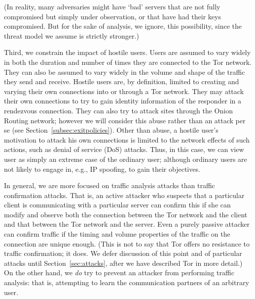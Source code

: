 \documentclass[times,10pt,twocolumn]{article}
\begin{document}
(In reality, many adversaries might have `bad' servers that are not
fully compromised but simply under observation, or that have had their keys
compromised.  But for the sake of analysis, we ignore, this possibility,
since the threat model we assume is strictly stronger.)

Third, we constrain the impact of hostile users.  Users are assumed to vary
widely in both the duration and number of times they are connected to the Tor
network. They can also be assumed to vary widely in the volume and shape of
the traffic they send and receive. Hostile users are, by definition, limited
to creating and varying their own connections into or through a Tor
network. They may attack their own connections to try to gain identity
information of the responder in a rendezvous connection. They can also try to
attack sites through the Onion Routing network; however we will consider this
abuse rather than an attack per se (see
Section~\ref{subsec:exitpolicies}). Other than abuse, a hostile user's
motivation to attack his own connections is limited to the network effects of
such actions, such as denial of service (DoS) attacks.  Thus, in this case,
we can view user as simply an extreme case of the ordinary user; although
ordinary users are not likely to engage in, e.g., IP spoofing, to gain their
objectives.

In general, we are more focused on traffic analysis attacks than
traffic confirmation attacks. 
That is, an active attacker who suspects that
a particular client is communicating with a particular server can
confirm this if she can modify and observe both the
connection between the Tor network and the client and that between the
Tor network and the server. Even a purely passive attacker can
confirm traffic if the timing and volume properties of the traffic on
the connection are unique enough.  (This is not to say that Tor offers
no resistance to traffic confirmation; it does.  We defer discussion
of this point and of particular attacks until Section~\ref{sec:attacks},
after we have described Tor in more detail.)
On the other hand, we {\it do} try to prevent an attacker from
performing traffic analysis: that is, attempting to learn the communication
partners of an arbitrary user.
\end{document}
